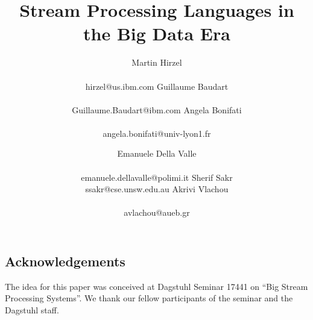 \documentclass[preprint]{sig-alternate-10pt}
\begin{document}
\title{Stream Processing Languages in the Big Data Era}

\newcommand*{\emailn}[1]{\textsf{\normalsize #1}}

\author{
\alignauthor
Martin Hirzel\\
  \\
  \emailn{hirzel@us.ibm.com}
\alignauthor
Guillaume Baudart\\
  \\
  \emailn{Guillaume.Baudart@ibm.com}
\alignauthor
Angela Bonifati\\
  \\
  \emailn{angela.bonifati@univ-lyon1.fr}
\and
\alignauthor
Emanuele Della Valle\\
  \\
  \emailn{emanuele.dellavalle@polimi.it}
\alignauthor
Sherif Sakr\\
  \emailn{ssakr@cse.unsw.edu.au}
\alignauthor
Akrivi Vlachou\\
  \\
  \emailn{avlachou@aueb.gr}}

\maketitle

\begin{abstract}
  
\end{abstract}







\subsection*{Acknowledgements}

The idea for this paper was conceived at Dagstuhl Seminar 17441 on
``Big Stream Processing Systems''. We thank our fellow participants of
the seminar and the Dagstuhl staff.


\balance

\end{document}
